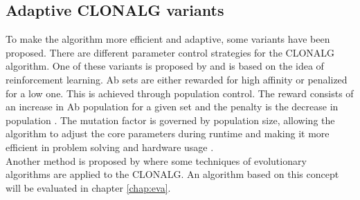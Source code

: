 \subsection{Adaptive CLONALG variants}
To make the algorithm more efficient and adaptive, some variants have been proposed. There are different parameter control strategies for the CLONALG algorithm. One of these variants is proposed by \cite{RIFF09} and is based on the idea of reinforcement learning. Ab sets are either rewarded for high affinity or penalized for a low one. This is achieved through population control. The reward consists of an increase in Ab population for a given set and the penalty is the decrease in population \cite{RIFF09}. The mutation factor is governed by population size, allowing the algorithm to adjust the core parameters during runtime and making it more efficient in problem solving and hardware usage \cite{RIFF09}.\\
Another method is proposed by \cite{Garret04} where some techniques of evolutionary algorithms are applied to the CLONALG. An algorithm based on this concept will be evaluated in chapter \ref{chap:eva}.
 




